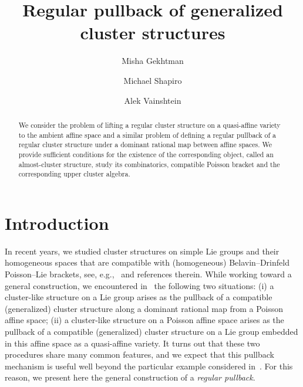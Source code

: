 \documentclass{amsart}
\theoremstyle{definition}
\theoremstyle{remark}
\numberwithin{equation}{section}
\numberwithin{theorem}{section}
\begin{document}
\title{Regular pullback of generalized cluster structures}


\author{Misha Gekhtman}
\address{Department of Mathematics, University of Notre Dame, Notre Dame,
IN 46556}

\author{Michael Shapiro}
\address{Department of Mathematics, Michigan State University, East Lansing,
MI 48823}

\author{Alek Vainshtein}
\address{Department of Mathematics \& Department of Computer Science, University of Haifa, Haifa,
Mount Carmel 31905, Israel}

\begin{abstract}
We consider the problem of lifting a regular cluster structure on a quasi-affine variety to the ambient affine space and a similar problem of defining a regular pullback of a regular cluster structure under a dominant rational map between affine spaces. We provide sufficient conditions for the existence of the corresponding object, called an almost-cluster structure, study its combinatorics, compatible Poisson bracket and the corresponding upper cluster algebra.  
\end{abstract}


\maketitle


\medskip

\section{Introduction}

 In recent years, we studied cluster structures on simple Lie groups and their homogeneous spaces that are compatible with (homogeneous) Belavin--Drinfeld Poisson--Lie brackets, see, e.g.,~\cite{GSVple} and references therein. While working toward a general construction, we encountered in~\cite{currentGSV} the following two situations: (i) a cluster-like structure on a Lie group arises as the pullback of a compatible (generalized) cluster structure along a dominant rational map from a Poisson affine space; (ii) a cluster-like structure on a Poisson affine space arises as the pullback of a compatible (generalized) cluster structure on a Lie group embedded in this affine space as a quasi-affine variety.
It turns out that these two procedures share many common features, and 
we expect that this pullback mechanism is useful well beyond the particular example considered in~\cite{currentGSV}. For this reason, we present here the general construction of a \emph{regular pullback\/}.
\end{document}
